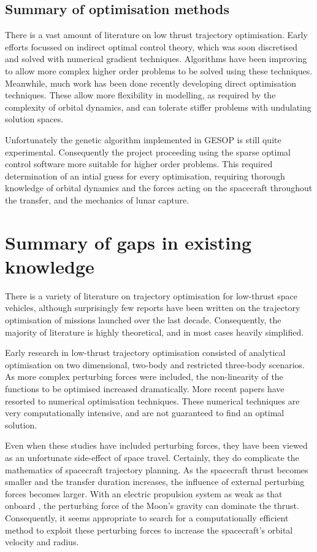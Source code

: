 \subsection{Summary of optimisation methods}

There is a vast amount of literature on low thrust trajectory optimisation. Early efforts focussed on indirect optimal control theory, which was soon discretised and solved with numerical gradient techniques. Algorithms have been improving to allow more complex higher order problems to be solved using these techniques. Meanwhile, much work has been done recently developing direct optimisation techniques. These allow more flexibility in modelling, as required by the complexity of orbital dynamics, and can tolerate stiffer problems with undulating solution spaces. 

Unfortunately the genetic algorithm implemented in GESOP is still quite experimental. Consequently the project proceeding using the sparse optimal control software more suitable for higher order problems. This required determination of an intial guess for every optimisation, requiring thorough knowledge of orbital dynamics and the forces acting on the spacecraft throughout the transfer, and the mechanics of lunar capture.



\section{Summary of gaps in existing knowledge}

There is a variety of literature on trajectory optimisation for low-thrust space vehicles, although surprisingly few reports have been written on the trajectory optimisation of missions launched over the last decade. Consequently, the majority of literature is highly theoretical, and in most cases heavily simplified. 

Early research in low-thrust trajectory optimisation consisted of analytical optimisation on two dimensional, two-body and restricted three-body scenarios. As more complex perturbing forces were included, the non-linearity of the functions to be optimised increased dramatically. More recent papers have resorted to numerical optimisation techniques. These numerical techniques are very computationally intensive, and are not guaranteed to find an optimal solution.

Even when these studies have included perturbing forces, they have been viewed as an unfortunate side-effect of space travel. Certainly, they do complicate the mathematics of spacecraft trajectory planning. As the spacecraft thrust becomes smaller and the transfer duration increases, the influence of external perturbing forces becomes larger. With an electric propulsion system as weak as that onboard \BW, the perturbing force of the Moon's gravity can dominate the thrust. Consequently, it seems appropriate to search for a computationally efficient method to exploit these perturbing forces to increase the spacecraft's orbital velocity and radius.